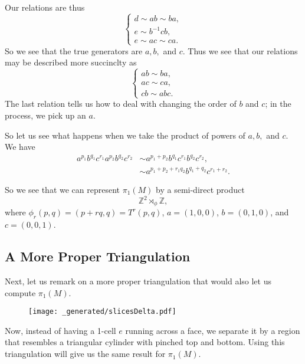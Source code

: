 Our relations are thus
\begin{equation}
\begin{cases}
d \sim ab \sim ba, \\
e \sim b^{-1}cb , \\
e \sim ac \sim ca.
\end{cases}
\end{equation}
So we see that the true generators are \(a, b,\) and \(c\). Thus we see that our relations may be described more succinclty as
\begin{equation}
\begin{cases}
ab \sim ba, \\
ac \sim ca, \\
cb \sim abc.
\end{cases}
\end{equation}
The last relation tells us how to deal with changing the order of \(b\) and \(c\); in the process, we pick up an \(a\).

So let us see what happens when we take the product of powers of \(a, b,\) and \(c\). We have
\begin{align}
a^{p_1}b^{q_1}c^{r_1} a^{p_2}b^{q_2}c^{r_2} & \sim a^{p_1 + p_2} b^{q_1}c^{r_1}b^{q_2}c^{r_2}, \\
 & \sim a^{p_1 + p_2 + r_1 q_2} b^{q_1 + q_2} c^{r_1 + r_2}.  
\end{align}

So we see that we can represent \(\pi_1(M)\) by a semi-direct product
\begin{equation}
\mathbb Z^2 \rtimes_\phi \mathbb Z,
\end{equation}
where \(\phi_r(p, q) = (p + rq, q) = T^r (p, q)\), \(a = (1, 0, 0)\), \(b = (0, 1, 0)\), and \(c = (0, 0, 1)\).

\subsection*{A More Proper Triangulation}

Next, let us remark on a more proper triangulation that would also let us compute \(\pi_1(M)\). 
\begin{figure}[H]
\centering
\texttt{[image: \_generated/slicesDelta.pdf]}
\end{figure}

Now, instead of having a 1-cell \(e\) running across a face, we separate it by a region that resembles a triangular cylinder with pinched top and bottom.
Using this triangulation will give us the same result for \(\pi_1(M)\).
